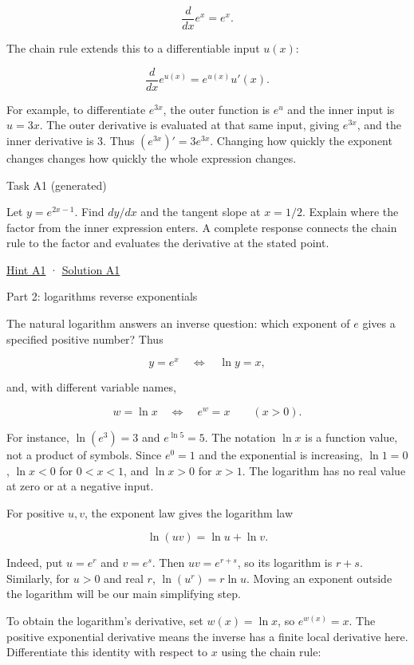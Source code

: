 \documentclass[
  11pt,
]{article}
\begin{document}
\[
\frac{d}{dx}e^x=e^x.
\]

The chain rule extends this to a differentiable input \(u(x)\):

\[
\frac{d}{dx}e^{u(x)}=e^{u(x)}u'(x).
\]

For example, to differentiate \(e^{3x}\), the outer function is \(e^u\)
and the inner input is \(u=3x\). The outer derivative is evaluated at
that same input, giving \(e^{3x}\), and the inner derivative is 3. Thus
\((e^{3x})'=3e^{3x}\). Changing how quickly the exponent changes changes
how quickly the whole expression changes.

Task A1 (generated)

Let \(y=e^{2x-1}\). Find \(dy/dx\) and the tangent slope at \(x=1/2\).
Explain where the factor from the inner expression enters. A complete
response connects the chain rule to the factor and evaluates the
derivative at the stated point.

\protect\hyperlink{hint-a1}{Hint A1} ·
\protect\hyperlink{solution-a1}{Solution A1}

Part 2: logarithms reverse exponentials

The natural logarithm answers an inverse question: which exponent of
\(e\) gives a specified positive number? Thus

\[
y=e^x\quad\Longleftrightarrow\quad\ln y=x,
\]

and, with different variable names,

\[
w=\ln x\quad\Longleftrightarrow\quad e^w=x\qquad(x>0).
\]

For instance, \(\ln(e^3)=3\) and \(e^{\ln 5}=5\). The notation \(\ln x\)
is a function value, not a product of symbols. Since \(e^0=1\) and the
exponential is increasing, \(\ln1=0\), \(\ln x<0\) for \(0<x<1\), and
\(\ln x>0\) for \(x>1\). The logarithm has no real value at zero or at a
negative input.

For positive \(u,v\), the exponent law gives the logarithm law

\[
\ln(uv)=\ln u+\ln v.
\]

Indeed, put \(u=e^r\) and \(v=e^s\). Then \(uv=e^{r+s}\), so its
logarithm is \(r+s\). Similarly, for \(u>0\) and real \(r\),
\(\ln(u^r)=r\ln u\). Moving an exponent outside the logarithm will be
our main simplifying step.

To obtain the logarithm's derivative, set \(w(x)=\ln x\), so
\(e^{w(x)}=x\). The positive exponential derivative means the inverse
has a finite local derivative here. Differentiate this identity with
respect to \(x\) using the chain rule:
\end{document}
